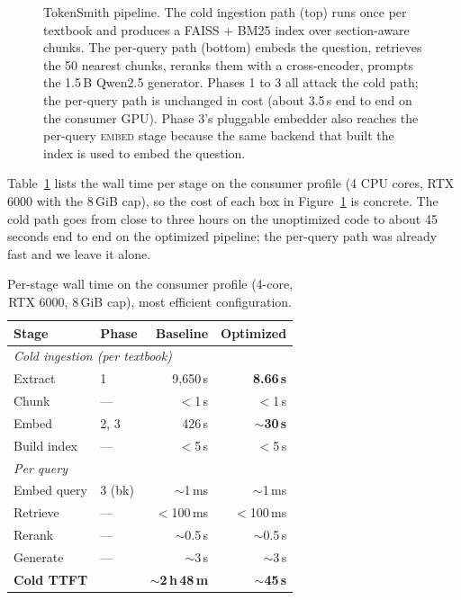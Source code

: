 \documentclass[sigconf]{acmart}
\begin{document}
\begin{figure}[t]
\caption{TokenSmith pipeline. The cold ingestion path (top) runs once
per textbook and produces a FAISS + BM25 index over section-aware
chunks. The per-query path (bottom) embeds the question, retrieves
the 50 nearest chunks, reranks them with a cross-encoder, prompts the
1.5\,B Qwen2.5 generator. Phases 1 to 3 all attack the cold path; the
per-query path is unchanged in cost (about 3.5\,s end to end on the
consumer GPU). Phase 3's pluggable embedder also reaches the per-query
\textsc{embed} stage because the same backend that built the index is
used to embed the question.}
\label{fig:pipeline}
\end{figure}

Table~\ref{tab:pipeline-summary} lists the wall time per stage on the
consumer profile (4 CPU cores, RTX 6000 with the 8\,GiB cap), so the
cost of each box in Figure~\ref{fig:pipeline} is concrete. The cold
path goes from close to three hours on the unoptimized code to about
45 seconds end to end on the optimized pipeline; the per-query path
was already fast and we leave it alone.

\begin{table}[h]
\caption{Per-stage wall time on the consumer profile (4-core,
RTX 6000, 8\,GiB cap), most efficient configuration.}
\label{tab:pipeline-summary}
\begin{tabular}{llrr}
\toprule
Stage              & Phase     & Baseline       & Optimized \\
\midrule
\multicolumn{4}{l}{\emph{Cold ingestion (per textbook)}} \\
\quad Extract      & 1         & 9{,}650\,s     & \textbf{8.66\,s} \\
\quad Chunk        & ---       & $<$1\,s        & $<$1\,s \\
\quad Embed        & 2, 3      & 426\,s         & \textbf{$\sim$30\,s} \\
\quad Build index  & ---       & $<$5\,s        & $<$5\,s \\
\midrule
\multicolumn{4}{l}{\emph{Per query}} \\
\quad Embed query  & 3 (bk)    & $\sim$1\,ms    & $\sim$1\,ms \\
\quad Retrieve     & ---       & $<$100\,ms     & $<$100\,ms \\
\quad Rerank       & ---       & $\sim$0.5\,s   & $\sim$0.5\,s \\
\quad Generate     & ---       & $\sim$3\,s     & $\sim$3\,s \\
\midrule
\textbf{Cold TTFT} &           & \textbf{$\sim$2\,h\,48\,m} & \textbf{$\sim$45\,s} \\
\bottomrule
\end{tabular}
\end{table}
\end{document}
